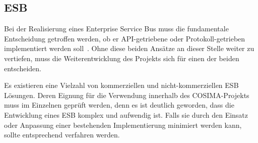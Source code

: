 
\subsection{ESB} %
\label{sub:esb_fragen}

  Bei der Realisierung eines Enterprise Service Bus muss die fundamentale Entscheidung getroffen werden, ob er API-getriebene oder Protokoll-getrieben implementiert werden soll~\citep[S. 59]{soa_in_practice}. Ohne diese beiden Ansätze an dieser Stelle weiter zu vertiefen, muss die Weiterentwicklung des Projekts sich für einen der beiden entscheiden.
  
  Es existieren eine Vielzahl von kommerziellen und nicht-kommerziellen ESB Lösungen. Deren Eignung für die Verwendung innerhalb des COSIMA-Projekts muss im Einzelnen geprüft werden, denn es ist deutlich geworden, dass die Entwicklung eines ESB komplex und aufwendig ist. Falls sie durch den Einsatz oder Anpassung einer bestehenden Implementierung minimiert werden kann, sollte entsprechend verfahren werden.



